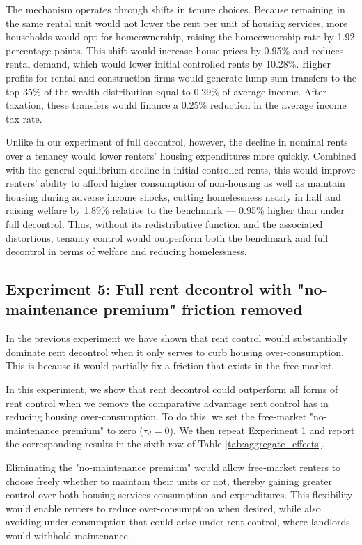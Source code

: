 \documentclass[parskip=full]{article}
\begin{document}
The mechanism operates through shifts in tenure choices. Because remaining in the same rental unit would not lower the rent per unit of housing services, more households would opt for homeownership, raising the homeownership rate by 1.92 percentage points. This shift would increase house prices by 0.95\% and reduces rental demand, which would lower initial controlled rents by 10.28\%. Higher profits for rental and construction firms would generate lump-sum transfers to the top 35\% of the wealth distribution equal to 0.29\% of average income. After taxation, these transfers would finance a 0.25\% reduction in the average income tax rate.

Unlike in our experiment of full decontrol, however, the decline in nominal rents over a tenancy would lower renters’ housing expenditures more quickly. Combined with the general-equilibrium decline in initial controlled rents, this would improve renters’ ability to afford higher consumption of non-housing as well as maintain housing during adverse income shocks, cutting homelessness nearly in half and raising welfare by 1.89\% relative to the benchmark — 0.95\% higher than under full decontrol. Thus, without its redistributive function and the associated distortions, tenancy control would outperform both the benchmark and full decontrol in terms of welfare and reducing homelessness.

\subsection{Experiment 5: Full rent decontrol with "no-maintenance premium" friction removed}\label{sec:exp_5}

In the previous experiment we have shown that rent control would substantially dominate rent decontrol when it only serves to curb housing over-consumption. This is because it would partially fix a friction that exists in the free market. 

In this experiment, we show that rent decontrol could outperform all forms of rent control when we remove the comparative advantage rent control has in reducing housing over-consumption. To do this, we set the free‑market "no-maintenance premium" to zero ($\tau_d=0$). We then repeat Experiment 1 and report the corresponding results in the sixth row of Table \ref{tab:aggregate_effects}. 

Eliminating the "no-maintenance premium" would allow free‑market renters to choose freely whether to maintain their units or not, thereby gaining greater control over both housing services consumption and expenditures. This flexibility would enable renters to reduce over‑consumption when desired, while also avoiding under‑consumption that could arise under rent control, where landlords would withhold maintenance.
\end{document}
